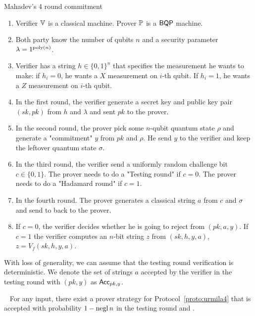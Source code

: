 \begin{protocol}{Mahadev's 4 round commitment}
\label{proto:urmila4}
\begin{enumerate}
    \item Verifier $\mathbb{V}$ is a classical machine. Prover $\mathbb{P}$ is a $\operatorname{\mathsf{BQP}}$ machine. 
    \item Both party know the number of qubits $n$ and a security parameter $\lambda=1^{\operatorname*{\operatorname{poly}}(n)}$.
    \item Verifier has a string $h \in \{0,1\}^n$ that specifies the measurement he wants to make: if $h_i=0$, he wants a $X$ measurement on $i$-th qubit. If $h_i=1$, he wants a $Z$ measurement on $i$-th qubit.  
    \item In the first round, the verifier generate a secret key and  public key pair $(sk,pk)$ from $h$ and $\lambda$ and sent $pk$ to the prover.
    \item In the second round, the prover pick some $n$-qubit quantum state $\rho$ and generate a "commitment" $y$ from $pk$ and $\rho$. He send $y$ to the verifier and keep the leftover quantum state $\sigma$.
    \item In the third round, the verifier send a uniformly random challenge bit $c\in \{0,1\}$. The prover needs to do a "Testing round" if $c=0$. The prover needs to do a "Hadamard round" if $c=1$.
    \item In the fourth round. The prover generates a classical string $a$ from $c$ and $\sigma$ and send to back to the prover.
    \item If $c=0$, the verifier decides whether he is going to reject from $(pk,a,y)$. If $c=1$ the verifier computes an $n$-bit string $z$ from $(sk,h,y,a)$, $z=V_f(sk,h,y,a)$.
\end{enumerate}
\end{protocol}

\begin{definition}
With loss of generality,  we can assume that the testing round verification is deterministic. We denote the set of strings $a$ accepted by the verifier in the testing round with $(pk,y)$ as $\mathsf{Acc}_{pk,y}$.
\end{definition}

\begin{lem}~\label{lem:trivial-4-round-strategy}
    For any input, there exist a prover strategy for Protocol~\ref{proto:urmila4} that is accepted with probability $1-\operatorname{negl}{n}$ in the testing round and .
\end{lem}

